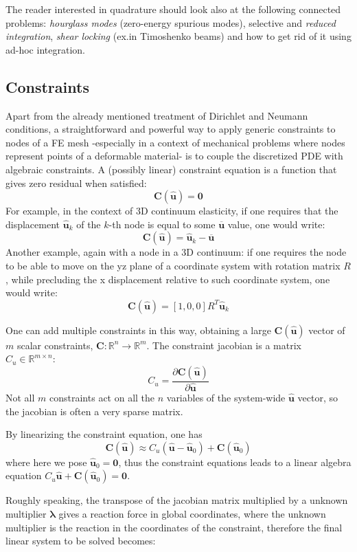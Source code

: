 \documentclass{digitaldynamics}
\def\vect#1{\bm{#1}}
\def\matr#1{{#1}}
\begin{document}
The reader interested in quadrature should look also at the following connected problems: \textit{hourglass modes} (zero-energy spurious modes), selective and \textit{reduced integration}, \textit{shear locking} (ex.in Timoshenko beams) and how to get rid of it using ad-hoc integration.


\subsection{Constraints}

Apart from the already mentioned treatment of Dirichlet and Neumann conditions, a straightforward and powerful way to apply generic constraints to nodes of a FE mesh -especially in a context of mechanical problems where nodes represent points of a deformable material- is to couple the discretized PDE with algebraic constraints. A (possibly linear) constraint equation is a function that gives zero residual when satisfied:
\[
\vect{C}(\hat{\vect{u}})=\vect{0}
\]
For example, in the context of 3D continuum elasticity, if one requires that the displacement $\hat{\vect{u}}_k$ of the $k$-th node is equal to some $\overline{\vect{u}}$ value, one would write:
\[
\vect{C}(\hat{\vect{u}}) = \hat{\vect{u}}_k - \overline{\vect{u}} 
\]
Another example, again with a node in a 3D continuum: if one requires the node to be able to move on the yz plane of a coordinate system with rotation matrix $\matr{R}$, while precluding the x displacement relative to such coordinate system, one would write:
\[
\vect{C}(\hat{\vect{u}}) = [1, 0, 0] \matr{R}^T \hat{\vect{u}}_k  
\]

One can add multiple constraints in this way, obtaining a large $\vect{C}(\hat{\vect{u}})$ vector of $m$ scalar constraints, $\vect{C}:\mathbb{R}^n \rightarrow \mathbb{R}^m$. 
The constraint jacobian is a matrix $\matr{C}_u \in \mathbb{R}^{m \times n}$:
\[
\matr{C}_u = \frac{\partial \vect{C}(\hat{\vect{u}})}{\partial \hat{\vect{u}}}
\]
Not all $m$ constraints act on all the $n$ variables of the system-wide $\hat{\vect{u}}$ vector, so the jacobian is often a very sparse matrix.

By linearizing the constraint equation, one has
\[
\vect{C}(\hat{\vect{u}}) \approx \matr{C}_u (\hat{\vect{u}}-\hat{\vect{u}}_0) + \vect{C}(\hat{\vect{u}}_0)
\]
where here we pose $\hat{\vect{u}}_0 = \vect{0}$, thus the constraint equations leads to a linear algebra equation 
$\matr{C}_u \hat{\vect{u}} + \vect{C}(\hat{\vect{u}}_0) = \vect{0}$.

Roughly speaking, the transpose of the jacobian matrix multiplied by a unknown multiplier $\vect{\lambda}$ gives a reaction force in global coordinates, where the unknown multiplier is the reaction in the coordinates of the constraint, therefore the final linear system to be solved becomes:
\end{document}
